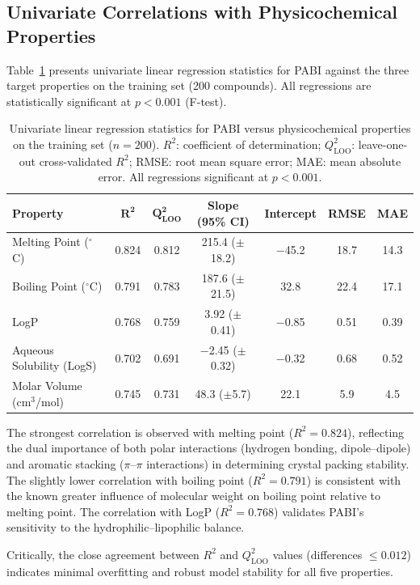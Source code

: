 \documentclass[12pt,a4paper]{article}
\begin{document}
\subsection{Univariate Correlations with Physicochemical Properties}

Table~\ref{tab:correlations} presents univariate linear regression statistics for PABI against the three target properties on the training set (200 compounds). All regressions are statistically significant at $p < 0.001$ (F-test).

\begin{table}[H]
\centering
\caption{Univariate linear regression statistics for PABI versus physicochemical properties on the training set ($n = 200$). $R^2$: coefficient of determination; $Q^2_{\text{LOO}}$: leave-one-out cross-validated $R^2$; RMSE: root mean square error; MAE: mean absolute error. All regressions significant at $p < 0.001$.}
\label{tab:correlations}
\begin{tabular}{@{}lcccccc@{}}
\toprule
\textbf{Property} & $\mathbf{R^2}$ & $\mathbf{Q^2_{\text{LOO}}}$ & \textbf{Slope (95\% CI)} & \textbf{Intercept} & \textbf{RMSE} & \textbf{MAE} \\
\midrule
Melting Point ($^{\circ}$C) & 0.824 & 0.812 & 215.4 ($\pm$18.2) & $-$45.2 & 18.7 & 14.3 \\
Boiling Point ($^{\circ}$C) & 0.791 & 0.783 & 187.6 ($\pm$21.5) & 32.8 & 22.4 & 17.1 \\
LogP & 0.768 & 0.759 & 3.92 ($\pm$0.41) & $-$0.85 & 0.51 & 0.39 \\
Aqueous Solubility (LogS) & 0.702 & 0.691 & $-$2.45 ($\pm$0.32) & $-$0.32 & 0.68 & 0.52 \\
Molar Volume (cm$^3$/mol) & 0.745 & 0.731 & 48.3 ($\pm$5.7) & 22.1 & 5.9 & 4.5 \\
\bottomrule
\end{tabular}
\end{table}

The strongest correlation is observed with melting point ($R^2 = 0.824$), reflecting the dual importance of both polar interactions (hydrogen bonding, dipole--dipole) and aromatic stacking ($\pi$--$\pi$ interactions) in determining crystal packing stability. The slightly lower correlation with boiling point ($R^2 = 0.791$) is consistent with the known greater influence of molecular weight on boiling point relative to melting point. The correlation with LogP ($R^2 = 0.768$) validates PABI's sensitivity to the hydrophilic--lipophilic balance.

Critically, the close agreement between $R^2$ and $Q^2_{\text{LOO}}$ values (differences $\leq 0.012$) indicates minimal overfitting and robust model stability for all five properties.
\end{document}
